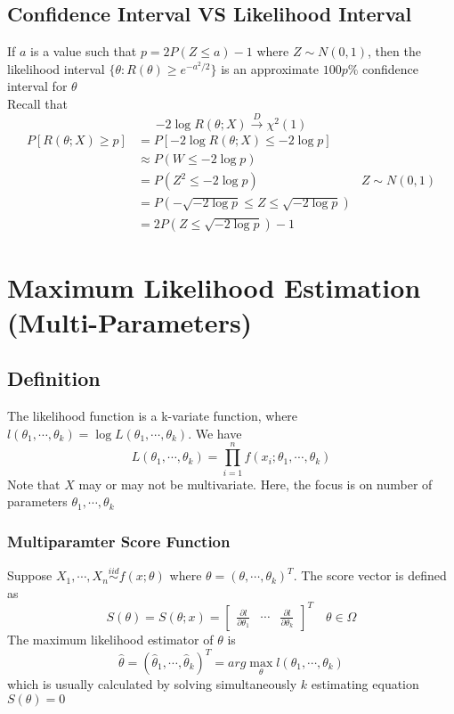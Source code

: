\documentclass[11pt]{article}
\newcommand{\cv}[1]{\begin{bmatrix} #1 \end{bmatrix}}
\begin{document}
\subsection{Confidence Interval VS Likelihood Interval}
If $a$ is a value such that $p=2P(Z\leq a)-1$ where $Z\sim N(0,1)$, then the likelihood interval $\{\theta:R(\theta)\geq e^{-a^2/2}\}$
is an approximate $100p\%$ confidence interval for $\theta$ \\
Recall that 
\[-2\log R(\theta;X)\overset{D}{\rightarrow}\chi^2(1)\] 
\begin{align*}
    P[R(\theta;X)\geq p] &= P[-2\log R(\theta;X)\leq -2\log p] \\
                         &\approx P(W\leq -2\log p) \\
                         &= P(Z^2\leq -2\log p) &Z\sim N(0,1)\\
                         &= P(-\sqrt{-2\log p}\leq Z\leq\sqrt{-2\log p}) \\
                         &= 2P(Z\leq\sqrt{-2\log p})-1
\end{align*}

\section{Maximum Likelihood Estimation (Multi-Parameters)}
\subsection{Definition}
The likelihood function is a k-variate function, where $l(\theta_1,\cdots,\theta_k)=\log L(\theta_1,\cdots,\theta_k)$.
We have 
\[L(\theta_1,\cdots,\theta_k) = \prod_{i=1}^{n}f(x_i;\theta_1,\cdots,\theta_k)\]
Note that $X$ may or may not be multivariate. Here, the focus is on number of parameters $\theta_1,\cdots,\theta_k$
\subsubsection{Multiparamter Score Function}
Suppose $X_1,\cdots,X_n\overset{iid}{\sim}f(x;\theta)$ where $\theta=(\theta,\cdots,\theta_k)^T$.
The score vector is defined as 
\[S(\theta) = S(\theta;x) = \cv{\frac{\partial l}{\partial\theta_1}&\cdots&\frac{\partial l}{\partial\theta_k}}^T\quad\theta\in\Omega\]
The maximum likelihood estimator of $\theta$ is 
\[\hat\theta = (\hat\theta_1,\cdots,\hat\theta_k)^T = arg\max_{\theta}l(\theta_1,\cdots,\theta_k)\]
which is usually calculated by solving simultaneously $k$ estimating equation $S(\theta)=0$
\end{document}
